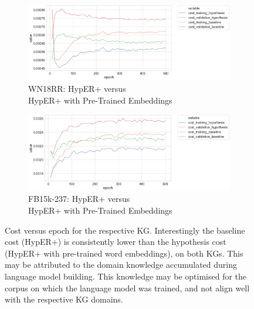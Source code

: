 \begin{figure}[H]
	\begin{subfigure}[b]{.5\linewidth}
   		\centering
    		\includegraphics[width=1.0\linewidth, height=0.6\linewidth]{WN18RR_Cost_Results_ptwv}
		\captionsetup{justification=centering}
		\caption{WN18RR: HypER+ versus \\ HypER+ with Pre-Trained Embeddings}
	\end{subfigure}
	\begin{subfigure}[b]{.5\linewidth}
   		\centering
		\includegraphics[width=1.0\linewidth, height=0.6\linewidth]{FB15k-237_Cost_Results_ptwv}
		\captionsetup{justification=centering}
		\caption{FB15k-237: HypER+ versus \\ HypER+ with Pre-Trained Embeddings}
	\end{subfigure}
	\captionsetup{justification=centering}
	\caption{Cost versus epoch for the respective KG. Interestingly the baseline cost (HypER+) is consistently lower than the hypothesis cost (HypER+ with pre-trained word embeddings), on both KGs. This may be attributed to the domain knowledge accumulated during language model building. This knowledge may be optimised for the corpus on which the language model was trained, and not align well with the respective KG domains.}
\end{figure}


